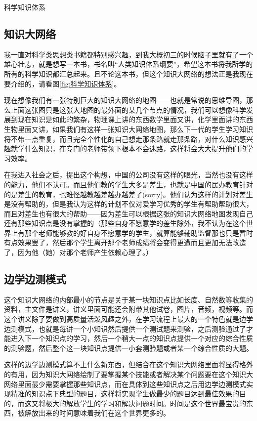 \documentclass[12pt]{exam}%
\begin{document}
\begin{linefig}[0.85]{科学知识体系}
\caption{科学知识体系}
\label{fig:科学知识体系}
\end{linefig}

\subsection{知识大网络}
我一直对科学类思想类书籍都特别感兴趣，到我大概初三的时候脑子里就有了一个雄心壮志，就是想写一本书，书名叫“人类知识体系纲要”，希望这本书将我所学的所有的科学知识都汇总起来。且不论这本书，但这个知识大网络的想法正是我现在要介绍的，请看图\ref{fig:科学知识体系}。

现在想像我们有一张特别巨大的知识大网络的地图——也就是常说的思维导图，那么上面这张图只是这张大地图的最外面的某几个节点的情况，我们可以想像科学发展到现在知识是如此的繁杂，物理课上讲的东西数学里面又讲，化学里面讲的东西生物里面又讲，如果我们有这样一张知识大网络地图，那么下一代的学生学习知识将不带一点重复，而且完全个性化的自己想走那条路就走那条路，对什么知识感兴趣就学什么知识，在专门的老师带领下根本不会迷路，这样将会大大提升他们的学习效率。

在我进入社会之后，提出这个构想，中国的公司没有这样的眼光，当然也没有这样的能力，他们不认可。而且他们教的学生大多是差生，也就是中国的民办教育针对的是差生的教育，也难怪越教越差越办越差了(sorry)。他们认为这样的计划对差生是没有帮助的，但是我认为这样的计划不仅对爱学习优秀的学生有帮助帮助很大，而且对差生也有很大的帮助——因为差生可以根据这张的知识大网络地图发现自己还有那些知识点是没有掌握的（那些自身不愿意学的差生除外，我不认为在这个世界上有那个老师能够教的好自身不愿意学的学生，就算能够辅助监督那也只是暂时有点效果罢了，然后那个学生离开那个老师成绩将会变得更遭而且更加无法改造了，因为他（她）对那个老师产生依赖心理了。）

\subsection{边学边测模式}
这个知识大网络的内部最小的节点是关于某一块知识点比如长度、自然数等收集的资料，主文件是讲义，讲义里面可能还会附带其他试卷，图片，音频，视频等。而这个讲义除了要做到高质量活泼风趣之外，在学习流程上最大的一个特色就是边学边测模式，也就是每讲一个小知识然后提供一个测试题来测验，之后测验通过了才能进入下一个知识点的学习，然后一个稍大一点的知识点提供一个对应的综合性质的测验题，然后整个这一块知识点提供一小套测验题或者某一个综合性质的大题。

这样的边学边测模式算不上什么新东西，但结合在这个知识大网络里面将显得格外的有用，因为知识大网络绘制了要掌握某个技能或者解决某个问题要在这个知识大网络里面最少需要掌握那些知识点，而在具体到这些知识点之后用边学边测模式实现精准的知识点下典型的题目，这样将实现学生做最少的题目达到最佳效果的目的，而这又将极大的解放学生的学习和解决问题时间。时间是这个世界最宝贵的东西，被解放出来的时间意味着我们在这个世界更多的。
\end{document}
